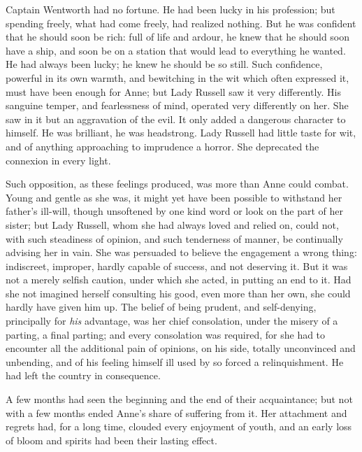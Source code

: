 Captain Wentworth had no fortune. He had been lucky in his profession; but spending freely, what had come freely, had realized nothing. But he was confident that he should soon be rich: full of life and ardour, he knew that he should soon have a ship, and soon be on a station that would lead to everything he wanted. He had always been lucky; he knew he should be so still. Such confidence, powerful in its own warmth, and bewitching in the wit which often expressed it, must have been enough for Anne; but Lady Russell saw it very differently. His sanguine temper, and fearlessness of mind, operated very differently on her. She saw in it but an aggravation of the evil. It only added a dangerous character to himself. He was brilliant, he was headstrong. Lady Russell had little taste for wit, and of anything approaching to imprudence a horror. She deprecated the connexion in every light.

Such opposition, as these feelings produced, was more than Anne could combat. Young and gentle as she was, it might yet have been possible to withstand her father's ill-will, though unsoftened by one kind word or look on the part of her sister; but Lady Russell, whom she had always loved and relied on, could not, with such steadiness of opinion, and such tenderness of manner, be continually advising her in vain. She was persuaded to believe the engagement a wrong thing: indiscreet, improper, hardly capable of success, and not deserving it. But it was not a merely selfish caution, under which she acted, in putting an end to it. Had she not imagined herself consulting his good, even more than her own, she could hardly have given him up. The belief of being prudent, and self-denying, principally for \textit{his} advantage, was her chief consolation, under the misery of a parting, a final parting; and every consolation was required, for she had to encounter all the additional pain of opinions, on his side, totally unconvinced and unbending, and of his feeling himself ill used by so forced a relinquishment. He had left the country in consequence.

A few months had seen the beginning and the end of their acquaintance; but not with a few months ended Anne's share of suffering from it. Her attachment and regrets had, for a long time, clouded every enjoyment of youth, and an early loss of bloom and spirits had been their lasting effect.

